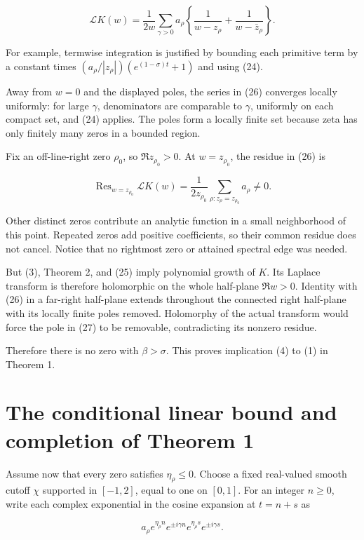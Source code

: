 \documentclass[
  11pt,
]{article}
\begin{document}
\[
\mathcal LK(w)
=\frac1{2w}\sum_{\gamma>0}a_\rho
\left\{\frac1{w-z_\rho}+\frac1{w-\bar z_\rho}\right\}. \tag{26}
\]

For example, termwise integration is justified by bounding each
primitive term by a constant times
\((a_\rho/|z_\rho|)(e^{(1-\sigma)t}+1)\) and using (24).

Away from \(w=0\) and the displayed poles, the series in (26) converges
locally uniformly: for large \(\gamma\), denominators are comparable to
\(\gamma\), uniformly on each compact set, and (24) applies. The poles
form a locally finite set because zeta has only finitely many zeros in a
bounded region.

Fix an off-line-right zero \(\rho_0\), so \(\Re z_{\rho_0}>0\). At
\(w=z_{\rho_0}\), the residue in (26) is

\[
\operatorname{Res}_{w=z_{\rho_0}}\mathcal LK(w)
=\frac1{2z_{\rho_0}}
\sum_{\rho:z_\rho=z_{\rho_0}}a_\rho\ne0. \tag{27}
\]

Other distinct zeros contribute an analytic function in a small
neighborhood of this point. Repeated zeros add positive coefficients, so
their common residue does not cancel. Notice that no rightmost zero or
attained spectral edge was needed.

But (3), Theorem 2, and (25) imply polynomial growth of \(K\). Its
Laplace transform is therefore holomorphic on the whole half-plane
\(\Re w>0\). Identity with (26) in a far-right half-plane extends
throughout the connected right half-plane with its locally finite poles
removed. Holomorphy of the actual transform would force the pole in (27)
to be removable, contradicting its nonzero residue.

Therefore there is no zero with \(\beta>\sigma\). This proves
implication (4) to (1) in Theorem 1.

\hypertarget{the-conditional-linear-bound-and-completion-of-theorem-1}{%
\section{The conditional linear bound and completion of Theorem
1}\label{the-conditional-linear-bound-and-completion-of-theorem-1}}

Assume now that every zero satisfies \(\eta_\rho\le0\). Choose a fixed
real-valued smooth cutoff \(\chi\) supported in \([-1,2]\), equal to one
on \([0,1]\). For an integer \(n\ge0\), write each complex exponential
in the cosine expansion at \(t=n+s\) as

\[
a_\rho e^{\eta_\rho n}e^{\pm i\gamma n}
 e^{\eta_\rho s}e^{\pm i\gamma s}.
\]
\end{document}
